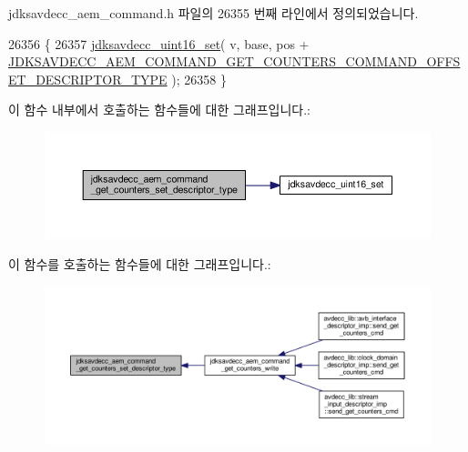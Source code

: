 jdksavdecc\+\_\+aem\+\_\+command.\+h 파일의 26355 번째 라인에서 정의되었습니다.


\begin{DoxyCode}
26356 \{
26357     \hyperlink{group__endian_ga14b9eeadc05f94334096c127c955a60b}{jdksavdecc\_uint16\_set}( v, base, pos + 
      \hyperlink{group__command__get__counters_gaf358c2a51ce4e35d7c49ceda59421762}{JDKSAVDECC\_AEM\_COMMAND\_GET\_COUNTERS\_COMMAND\_OFFSET\_DESCRIPTOR\_TYPE}
       );
26358 \}
\end{DoxyCode}


이 함수 내부에서 호출하는 함수들에 대한 그래프입니다.\+:
\nopagebreak
\begin{figure}[H]
\begin{center}
\leavevmode
\includegraphics[width=350pt]{group__command__get__counters_ga665bf52a47ee7dddb31ef4a2013d504f_cgraph}
\end{center}
\end{figure}




이 함수를 호출하는 함수들에 대한 그래프입니다.\+:
\nopagebreak
\begin{figure}[H]
\begin{center}
\leavevmode
\includegraphics[width=350pt]{group__command__get__counters_ga665bf52a47ee7dddb31ef4a2013d504f_icgraph}
\end{center}
\end{figure}


